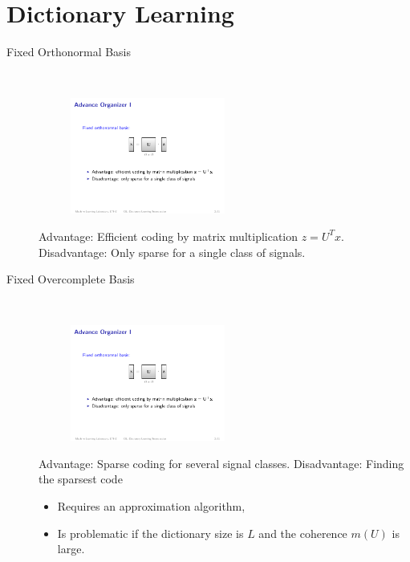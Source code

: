 \section{Dictionary Learning}
\begin{description}
    \item[Fixed Orthonormal Basis] $\ $
        \begin{figure}[H]
            \centering
            \includegraphics[width=0.5\textwidth,page=1]{img/10_bases}
        \end{figure}
        \subitem Advantage: Efficient coding by matrix multiplication $z = U^Tx$.
        \subitem Disadvantage: Only sparse for a single class of signals.

    \item[Fixed Overcomplete Basis] $\ $
        \begin{figure}[H]
            \centering
            \includegraphics[width=0.5\textwidth,page=2]{img/10_bases}
        \end{figure}
        \subitem Advantage: Sparse coding for several signal classes.
        \subitem Disadvantage: Finding the sparsest code
            \begin{itemize}
            \item Requires an approximation algorithm,
            \item Is problematic if the dictionary size is $L$ and the coherence $m(U)$ is large.
            \end{itemize}


\end{description}
